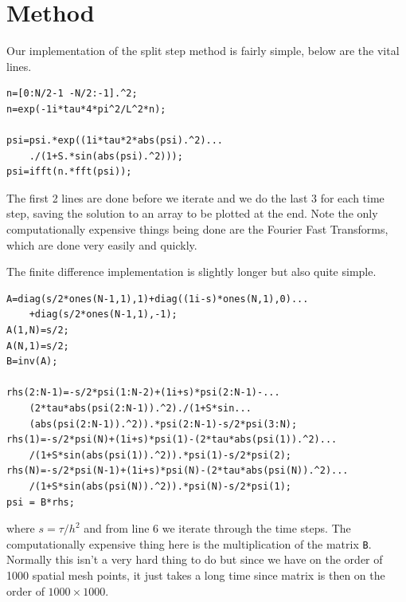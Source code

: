 \documentclass[12pt]{article}
\numberwithin{equation}{section}
\numberwithin{figure}{section}
\numberwithin{table}{section}
\begin{document}
\section{Method}\label{sec:Method}
\par Our implementation of the split step method is fairly simple, below are the vital lines.
\begin{lstlisting}
n=[0:N/2-1 -N/2:-1].^2;
n=exp(-1i*tau*4*pi^2/L^2*n);

psi=psi.*exp((1i*tau*2*abs(psi).^2)...
    ./(1+S.*sin(abs(psi).^2)));
psi=ifft(n.*fft(psi));
\end{lstlisting}
The first 2 lines are done before we iterate and we do the last 3 for each time step, saving the solution to an array to be plotted at the end. Note the only computationally expensive things being done are the Fourier Fast Transforms, which are done very easily and quickly.
\par The finite difference implementation is slightly longer but also quite simple.
\begin{lstlisting}
A=diag(s/2*ones(N-1,1),1)+diag((1i-s)*ones(N,1),0)...
    +diag(s/2*ones(N-1,1),-1);
A(1,N)=s/2;
A(N,1)=s/2;
B=inv(A);

rhs(2:N-1)=-s/2*psi(1:N-2)+(1i+s)*psi(2:N-1)-...
    (2*tau*abs(psi(2:N-1)).^2)./(1+S*sin...
    (abs(psi(2:N-1)).^2)).*psi(2:N-1)-s/2*psi(3:N);
rhs(1)=-s/2*psi(N)+(1i+s)*psi(1)-(2*tau*abs(psi(1)).^2)...
    /(1+S*sin(abs(psi(1)).^2)).*psi(1)-s/2*psi(2);
rhs(N)=-s/2*psi(N-1)+(1i+s)*psi(N)-(2*tau*abs(psi(N)).^2)...
    /(1+S*sin(abs(psi(N)).^2)).*psi(N)-s/2*psi(1);
psi = B*rhs;
\end{lstlisting}
where $s=\tau/h^2$ and from line 6 we iterate through the time steps. The computationally expensive thing here is the multiplication of the matrix \texttt{B}. Normally this isn't a very hard thing to do but since we have on the order of 1000 spatial mesh points, it just takes a long time since matrix is then on the order of $1000\times1000$.\newline
\end{document}
